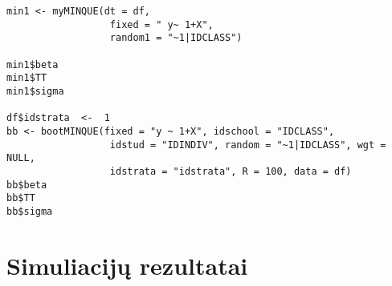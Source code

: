 \documentclass[12pt,a4paper]{article}
\begin{document}
\begin{appendix}
\begin{footnotesize}
\begin{verbatim}
min1 <- myMINQUE(dt = df,
                  fixed = " y~ 1+X",
                  random1 = "~1|IDCLASS")

min1$beta
min1$TT
min1$sigma

df$idstrata  <-  1
bb <- bootMINQUE(fixed = "y ~ 1+X", idschool = "IDCLASS",
                  idstud = "IDINDIV", random = "~1|IDCLASS", wgt = NULL,
                  idstrata = "idstrata", R = 100, data = df)
bb$beta
bb$TT
bb$sigma
\end{verbatim}
\end{footnotesize}
\end{appendix}

\newpage

\listoftables
 \listoffigures
  

\newpage
\section{Simuliacijų rezultatai}\label{sec:lenteles}
\end{document}
